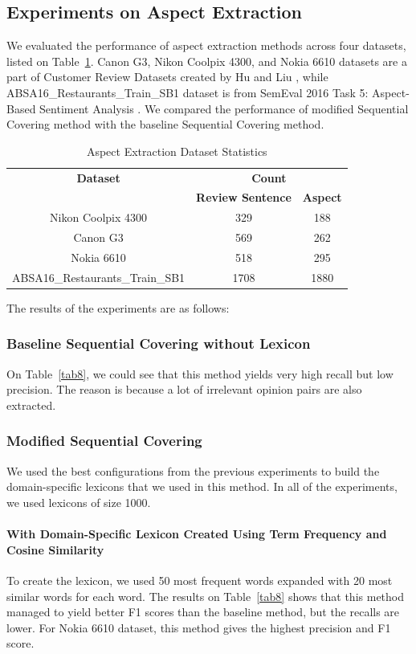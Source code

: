 \documentclass[a4paper,conference]{IEEEtran}
\begin{document}
\subsection{Experiments on Aspect Extraction}
We evaluated the performance of aspect extraction methods across four datasets, listed on Table~\ref{tab7}. Canon G3, Nikon Coolpix 4300, and Nokia 6610 datasets are a part of Customer Review Datasets created by Hu and Liu \cite{b16}, while ABSA16\_Restaurants\_Train\_SB1 dataset is from SemEval 2016 Task 5: Aspect-Based Sentiment Analysis \cite{b17}. We compared the performance of modified Sequential Covering method with the baseline Sequential Covering method.

\begin{table}[htbp]
\caption{Aspect Extraction Dataset Statistics}
\begin{center}
\begin{tabular}{|c|c|c|}
\hline
\textbf{Dataset} & \multicolumn{2}{|c|}{\textbf{Count}}\\
\cline{2-3}
&\textbf{Review Sentence} & \textbf{Aspect}\\
\hline
Nikon Coolpix 4300&329&188 \\
\hline
Canon G3&569&262 \\
\hline
Nokia 6610&518&295\\
\hline
ABSA16\_Restaurants\_Train\_SB1&1708&1880 \\
\hline
\end{tabular}
\label{tab7}
\end{center}
\end{table}

The results of the experiments are as follows:
\subsubsection{Baseline Sequential Covering without Lexicon}
On Table~\ref{tab8}, we could see that this method yields very high recall but low precision. The reason is because a lot of irrelevant opinion pairs are also extracted.
\subsubsection{Modified Sequential Covering}
We used the best configurations from the previous experiments to build the domain-specific lexicons that we used in this method. In all of the experiments, we used lexicons of size 1000.
\paragraph{With Domain-Specific Lexicon Created Using Term Frequency and Cosine Similarity}
To create the lexicon, we used 50 most frequent words expanded with 20 most similar words for each word. The results on Table~\ref{tab8} shows that this method managed to yield better F1 scores than the baseline method, but the recalls are lower. For Nokia 6610 dataset, this method gives the highest precision and F1 score.
\end{document}
